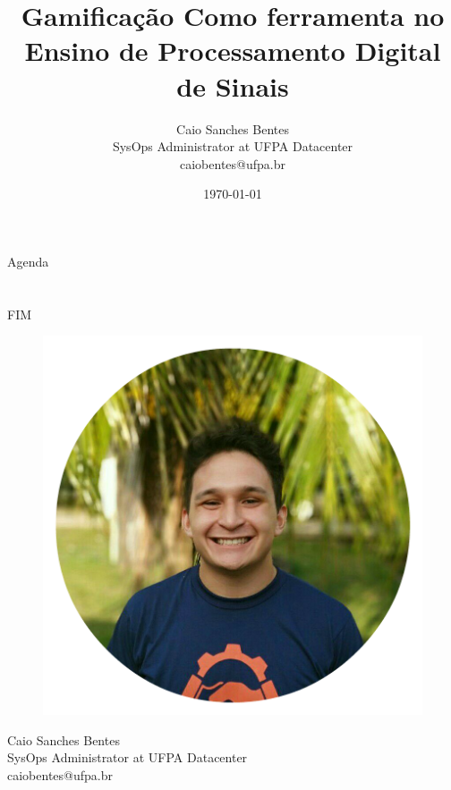\documentclass[unknownkeysallowed]{beamer}
\title[]{Gamificação Como ferramenta no Ensino de Processamento Digital de Sinais}
\date{
	\date{}}
\author[Caio Sanches Bentes]{
Caio Sanches Bentes
\texorpdfstring{\\ SysOps Administrator at UFPA Datacenter \\
caiobentes@ufpa.br}{}
}
\institute{Congresso Brasileiro de Educação em Engenharia} %
\date{\today}
\begin{document}
\frame{\titlepage}
\section[]{}
\begin{frame}{Agenda}
    \sloppy
	\tableofcontents
\end{frame}



\section{}
\begin{frame}{FIM}
    
    \begin{figure}
    \centering
    \includegraphics[scale=0.1]{figuras/02.png}
    \label{fig:my_label}
    \end{figure}
	
	\begin{center}
    Caio Sanches Bentes\\
    SysOps Administrator at UFPA Datacenter\\
    caiobentes@ufpa.br\\
	\end{center}

\end{frame}
\end{document}
